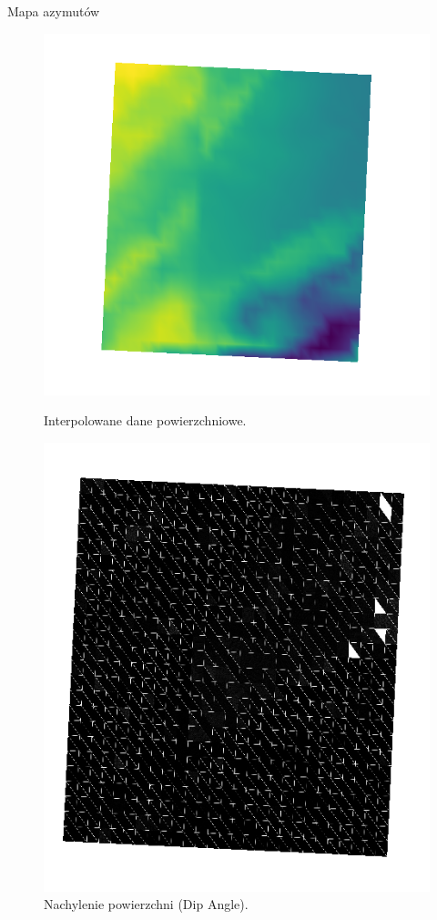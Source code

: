 \documentclass{beamer}
\begin{document}
\begin{frame}{Mapa azymutów}
\begin{figure}
\begin{minipage}{0.3\textwidth}
            \includegraphics[width=\textwidth]{Inter.png}
            \caption{Interpolowane dane powierzchniowe.}
        \end{minipage}
        \hspace{0.2cm} %
        \begin{minipage}{0.3\textwidth}
            \centering
            \includegraphics[width=\textwidth]{nach.png}
            \caption{Nachylenie powierzchni (Dip Angle).}
        \end{minipage}
    \end{figure}
\end{frame}
\end{document}
